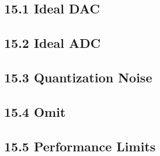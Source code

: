 \subsection{15.1 Ideal DAC}
\subsection{15.2 Ideal ADC}
\subsection{15.3 Quantization Noise}
\subsection{15.4 Omit}
\subsection{15.5 Performance Limits}
